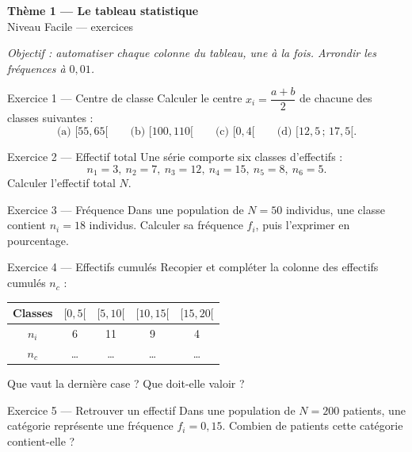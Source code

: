 \documentclass[11pt,a4paper]{article}
\newcommand{\bandeau}[2]{%
\begin{tcolorbox}[boxbase,colback=primary,colframe=primarydark,halign=center,
   before skip=2pt,after skip=12pt]
{\LARGE\bfseries\color{white} #1}\\[3pt]{\normalsize\color{white} #2}
\end{tcolorbox}}
\begin{document}
\bandeau{Thème 1 — Le tableau statistique}{Niveau Facile — exercices}

\noindent\textit{Objectif : automatiser chaque colonne du tableau, une à la fois. Arrondir les
fréquences à $0{,}01$.}\medskip

\begin{exobox}{Exercice 1 — Centre de classe}
Calculer le centre $x_i=\dfrac{a+b}{2}$ de chacune des classes suivantes :
\[
\text{(a) } [55,65[ \qquad \text{(b) } [100,110[ \qquad \text{(c) } [0,4[ \qquad
\text{(d) } [12{,}5\,;\,17{,}5[ .
\]
\end{exobox}

\begin{exobox}{Exercice 2 — Effectif total}
Une série comporte six classes d'effectifs :
\[ n_1=3,\ n_2=7,\ n_3=12,\ n_4=15,\ n_5=8,\ n_6=5. \]
Calculer l'effectif total $N$.
\end{exobox}

\begin{exobox}{Exercice 3 — Fréquence}
Dans une population de $N=50$ individus, une classe contient $n_i=18$ individus.
Calculer sa fréquence $f_i$, puis l'exprimer en pourcentage.
\end{exobox}

\begin{exobox}{Exercice 4 — Effectifs cumulés}
Recopier et compléter la colonne des effectifs cumulés $n_c$ :
\begin{center}
\renewcommand{\arraystretch}{1.15}
\begin{tabular}{|c|c|c|c|c|}
\hline
Classes & $[0,5[$ & $[5,10[$ & $[10,15[$ & $[15,20[$ \\\hline
$n_i$ & 6 & 11 & 9 & 4 \\\hline
$n_c$ & \dots & \dots & \dots & \dots \\\hline
\end{tabular}
\end{center}
Que vaut la dernière case ? Que doit-elle valoir ?
\end{exobox}

\begin{exobox}{Exercice 5 — Retrouver un effectif}
Dans une population de $N=200$ patients, une catégorie représente une fréquence $f_i=0{,}15$.
Combien de patients cette catégorie contient-elle ?
\end{exobox}
\end{document}
